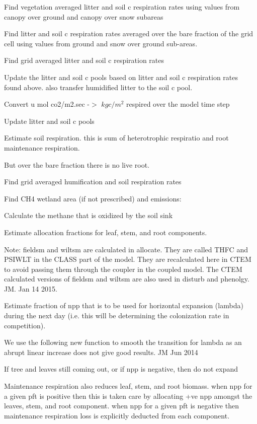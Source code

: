 Find vegetation averaged litter and soil c respiration rates using values from canopy over ground and canopy over snow subareas

Find litter and soil c respiration rates averaged over the bare fraction of the grid cell using values from ground and snow over ground sub-\/areas.

Find grid averaged litter and soil c respiration rates

Update the litter and soil c pools based on litter and soil c respiration rates found above. also transfer humidified litter to the soil c pool.

Convert u mol co2/m2.\+sec -\/$>$ $kg c/m^2$ respired over the model time step

Update litter and soil c pools

Estimate soil respiration. this is sum of heterotrophic respiratio and root maintenance respiration.

But over the bare fraction there is no live root.

Find grid averaged humification and soil respiration rates

Find C\+H4 wetland area (if not prescribed) and emissions\+:

Calculate the methane that is oxidized by the soil sink

Estimate allocation fractions for leaf, stem, and root components.

Note\+: fieldsm and wiltsm are calculated in allocate. They are called T\+H\+F\+C and P\+S\+I\+W\+L\+T in the C\+L\+A\+S\+S part of the model. They are recalculated here in C\+T\+E\+M to avoid passing them through the coupler in the coupled model. The C\+T\+E\+M calculated versions of fieldsm and wiltsm are also used in disturb and phenolgy. J\+M. Jan 14 2015.

Estimate fraction of npp that is to be used for horizontal expansion (lambda) during the next day (i.\+e. this will be determining the colonization rate in competition).

We use the following new function to smooth the transition for lambda as an abrupt linear increase does not give good results. J\+M Jun 2014

If tree and leaves still coming out, or if npp is negative, then do not expand

Maintenance respiration also reduces leaf, stem, and root biomass. when npp for a given pft is positive then this is taken care by allocating +ve npp amongst the leaves, stem, and root component. when npp for a given pft is negative then maintenance respiration loss is explicitly deducted from each component.

